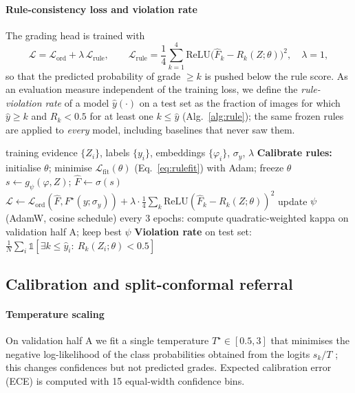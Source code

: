 \paragraph{Rule-consistency loss and violation rate} The grading head is trained with
\begin{equation}
\mathcal L=\mathcal L_{\mathrm{ord}}+\lambda\,\mathcal L_{\mathrm{rule}},\qquad
\mathcal L_{\mathrm{rule}}=\frac14\sum_{k=1}^4\mathrm{ReLU}\big(\hat F_k-R_k(Z;\theta)\big)^2,\quad\lambda=1,
\label{eq:total}
\end{equation}
so that the predicted probability of grade $\ge k$ is pushed below the rule score. As an evaluation measure independent of the training loss, we define the \emph{rule-violation rate} of a model $\hat y(\cdot)$ on a test set as the fraction of images for which $\hat y\ge k$ and $R_k<0.5$ for at least one $k\le\hat y$ (Alg.~\ref{alg:rule}); the same frozen rules are applied to \emph{every} model, including baselines that never saw them.

\begin{algorithm}[!htbp]
\caption{Rule calibration, rule-consistent training and violation rate.}
\label{alg:rule}
\begin{algorithmic}[1]
\Require training evidence $\{Z_i\}$, labels $\{y_i\}$, embeddings $\{\varphi_i\}$, $\sigma_y$, $\lambda$
\State \textbf{Calibrate rules:} initialise $\theta$; minimise $\mathcal L_{\mathrm{fit}}(\theta)$ (Eq.~\ref{eq:rulefit}) with Adam; freeze $\theta$
    \State $s\gets g_\psi(\varphi,Z)$; $\hat F\gets\sigma(s)$
    \State $\mathcal L\gets\mathcal L_{\mathrm{ord}}(\hat F,F^\star(y;\sigma_y))+\lambda\cdot\frac14\sum_k\mathrm{ReLU}(\hat F_k-R_k(Z;\theta))^2$
    \State update $\psi$ (AdamW, cosine schedule)
  \EndFor
  \State every 3 epochs: compute quadratic-weighted kappa on validation half A; keep best $\psi$
\EndFor
\State \textbf{Violation rate} on test set: $\frac1N\sum_i\mathbb 1[\exists k\le\hat y_i:\ R_k(Z_i;\theta)<0.5]$
\end{algorithmic}
\end{algorithm}

\subsection{Calibration and split-conformal referral}
\label{sec:conformal}
\paragraph{Temperature scaling} On validation half A we fit a single temperature $T^\star\in[0.5,3]$ that minimises the negative log-likelihood of the class probabilities obtained from the logits $s_k/T$ \citep{guo2017calibration}; this changes confidences but not predicted grades. Expected calibration error (ECE) is computed with 15 equal-width confidence bins.

